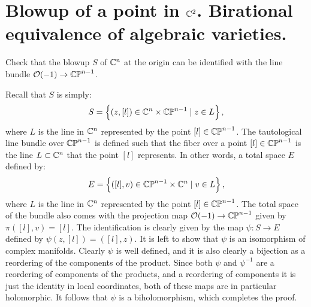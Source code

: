 \documentclass[11pt, a4paper]{article}
\begin{document}
\newpage

\section{Blowup of a point in \texorpdfstring{$\mathbb{C}^2$}{C}.
  Birational equivalence of algebraic varieties.}

\begin{exercise}
  Check that the blowup $S$ of $\mathbb{C}^n$ at the origin can be identified
  with the line bundle $\mathcal{O}(-1) \to \mathbb{CP}^{n-1}$.
\end{exercise}
\begin{solution}
  Recall that $S$ is simply:
  \[
    S =
    \left\{(z, [l]) \in \mathbb{C}^n \times \mathbb{CP}^{n-1} \mid z \in L\right\},
  \]
  where $L$ is the line in $\mathbb{C}^n$ represented by the point $[l] \in \mathbb{CP}^{n-1}$.
  The tautological line bundle over $\mathbb{CP}^{n-1}$ is defined such that
  the fiber over a point $[l] \in \mathbb{CP}^{n-1}$ is the line $L \subset \mathbb{C}^n$
  that the point $[l]$ represents.
  In other words, a total space $E$ defined by:
  \[
    E = \left\{([l],v) \in \mathbb{CP}^{n-1} \times \mathbb{C}^n \mid v \in L\right\},
  \]
  where $L$ is the line in $\mathbb{C}^n$ represented by the point $[l] \in \mathbb{CP}^{n-1}$.
  The total space of the bundle also comes with the projection
  map $\mathcal{O}(-1) \to \mathbb{CP}^{n-1}$ given by $\pi([l],v) = [l]$.
  The identification is clearly given by the map $\psi \colon S \to E$
  defined by $\psi(z,[l]) = ([l],z)$.
  It is left to show that $\psi$ is an isomorphism of complex manifolds.
  Clearly $\psi$ is well defined, and it is also clearly a bijection
  as a reordering of the components of the product.
  Since both $\psi$ and $\psi^{-1}$ are a reordering of components of the products,
  and a reordering of components it is just the identity in local coordinates,
  both of these maps are in particular holomorphic.
  It follows that $\psi$ is a biholomorphism, which completes the proof.
\end{solution}
\end{document}
